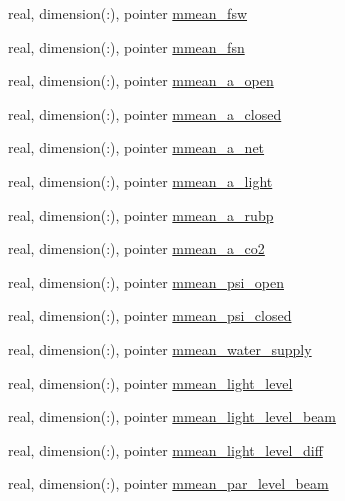 \begin{DoxyCompactItemize}
real, dimension(\+:), pointer \hyperlink{structed__state__vars_1_1patchtype_a1ab3886a5be83c7797e20b0c4d4e734d}{mmean\+\_\+fsw}
\item 
real, dimension(\+:), pointer \hyperlink{structed__state__vars_1_1patchtype_a14848c5d23cb631efe890a11708f3c54}{mmean\+\_\+fsn}
\item 
real, dimension(\+:), pointer \hyperlink{structed__state__vars_1_1patchtype_a4b6c97ad2775cded05f53ff33c2d031e}{mmean\+\_\+a\+\_\+open}
\item 
real, dimension(\+:), pointer \hyperlink{structed__state__vars_1_1patchtype_a871548c63f289ba40c07c7c7934858bd}{mmean\+\_\+a\+\_\+closed}
\item 
real, dimension(\+:), pointer \hyperlink{structed__state__vars_1_1patchtype_aec3a3627b2f3affd0477756d452b0db4}{mmean\+\_\+a\+\_\+net}
\item 
real, dimension(\+:), pointer \hyperlink{structed__state__vars_1_1patchtype_afe6505a35efd06710ac5619a2b4e6725}{mmean\+\_\+a\+\_\+light}
\item 
real, dimension(\+:), pointer \hyperlink{structed__state__vars_1_1patchtype_af9eca70ee98a775c68c808124be98c3c}{mmean\+\_\+a\+\_\+rubp}
\item 
real, dimension(\+:), pointer \hyperlink{structed__state__vars_1_1patchtype_a57857d28f03bf048c6e81570e8fdeead}{mmean\+\_\+a\+\_\+co2}
\item 
real, dimension(\+:), pointer \hyperlink{structed__state__vars_1_1patchtype_aaac9e8b74bbfd7e67688c9a9649c9084}{mmean\+\_\+psi\+\_\+open}
\item 
real, dimension(\+:), pointer \hyperlink{structed__state__vars_1_1patchtype_a80e65e2a9ababd4a496d7089a6c16827}{mmean\+\_\+psi\+\_\+closed}
\item 
real, dimension(\+:), pointer \hyperlink{structed__state__vars_1_1patchtype_a91a3d0d7922e42c099fa56d94ce61b4d}{mmean\+\_\+water\+\_\+supply}
\item 
real, dimension(\+:), pointer \hyperlink{structed__state__vars_1_1patchtype_a8d6e617dc57d1630a81da18171d928db}{mmean\+\_\+light\+\_\+level}
\item 
real, dimension(\+:), pointer \hyperlink{structed__state__vars_1_1patchtype_ac8d0f5a53a734a52f91923b1ff47bfa9}{mmean\+\_\+light\+\_\+level\+\_\+beam}
\item 
real, dimension(\+:), pointer \hyperlink{structed__state__vars_1_1patchtype_ab5c7da787c7968179fd8a704183bb00b}{mmean\+\_\+light\+\_\+level\+\_\+diff}
\item 
real, dimension(\+:), pointer \hyperlink{structed__state__vars_1_1patchtype_a72b70204b7bda51d33cc54502b8ea9dd}{mmean\+\_\+par\+\_\+level\+\_\+beam}

\end{DoxyCompactItemize}
